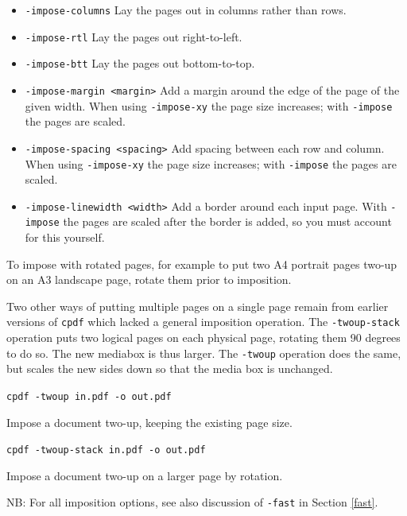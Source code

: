 \documentclass{book}
\begin{document}
\begin{itemize}
\item \texttt{-impose-columns} Lay the pages out in columns rather than rows.
\item \texttt{-impose-rtl} Lay the pages out right-to-left.
\item \texttt{-impose-btt} Lay the pages out bottom-to-top.
\item \texttt{-impose-margin <margin>} Add a margin around the edge of the page of the given width. When using \texttt{-impose-xy} the page size increases; with \texttt{-impose} the pages are scaled.
\item \texttt{-impose-spacing <spacing>} Add spacing between each row and column. When using \texttt{-impose-xy} the page size increases; with \texttt{-impose} the pages are scaled.
\item \texttt{-impose-linewidth <width>} Add a border around each input page. With \texttt{-impose} the pages are scaled after the border is added, so you must account for this yourself.

\end{itemize}

\noindent To impose with rotated pages, for example to put two A4 portrait pages two-up on an A3 landscape page, rotate them prior to imposition.

Two other ways of putting multiple pages on a single page remain from earlier versions of \texttt{cpdf} which lacked a general imposition operation.  The \texttt{-twoup-stack} operation puts two logical pages on each physical
page, rotating them 90 degrees to do so. The new mediabox is thus larger. The \texttt{-twoup} operation does the same, but scales the new sides down so
that the media box is unchanged.

  \begin{framed}
    \noindent\small\verb!cpdf -twoup in.pdf -o out.pdf!
 
    \vspace{2.5mm}
    \noindent Impose a document two-up, keeping the existing page size.

    \vspace{2.5mm}
    \noindent\small\verb!cpdf -twoup-stack in.pdf -o out.pdf!
 
    \vspace{2.5mm}
    \noindent Impose a document two-up on a larger page by rotation. 
  \end{framed}
 
\noindent NB: For all imposition options, see also discussion of \texttt{-fast} in Section \ref{fast}.
\end{document}

